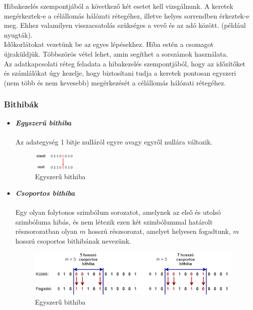 \documentclass[12pt]{article}
\begin{document}
    Hibakezelés szempontjából a következő két esetet kell vizsgálnunk. A keretek megérkeztek-e a célállomás hálózati rétegéhez, illetve helyes sorrendben érkeztek-e meg. Ehhez valamilyen visszacsatolás szükséges a vevő és az adó között. (például nyugták). \\

    \noindent Időkorlátokat vezetünk be az egyes lépésekhez. Hiba estén a csomagot újraküldjük. Többszörös vétel lehet, amin segíthet a sorszámok használata.\\

    \noindent Az adatkapcsolati réteg feladata a hibakezelés szempontjából, hogy az időzítőket és számlálókat úgy kezelje, hogy biztosítani tudja a keretek pontosan egyszeri (nem több és nem kevesebb) megérkezését a célállomás hálózati rétegéhez.

    \subsubsection*{Bithibák}

    \begin{itemize}[leftmargin=5.5mm]
        \renewcommand{\labelitemi}{$\vcenter{\hbox{\tiny$\bullet$}}$}
        \item \textbf{\emph{Egyszerű bithiba}} \\\\
        Az adategység 1 bitje nulláról egyre avagy egyről nullára változik.
        \begin{figure}[H]
            \centering
            \includegraphics[width=0.2\textwidth]{img/egyszeru_bithiba.png}
            \caption{Egyszerű bithiba}	
        \end{figure}
        \item \textbf{\emph{Csoportos bithiba}} \\\\
        Egy olyan folytonos szimbólum sorozatot, amelynek az első és utolsó szimbóluma hibás, és nem létezik ezen két szimbólummal határolt részsorozatban olyan $m$ hosszú részsorozat, amelyet helyesen fogadtunk, $m$ hosszú csoportos bithibának nevezünk.

        \begin{figure}[H]
            \centering
            \includegraphics[width=1.0\textwidth]{img/csoportos_bithiba.png}
            \caption{Egyszerű bithiba}	
        \end{figure}

    \end{itemize}
\end{document}
